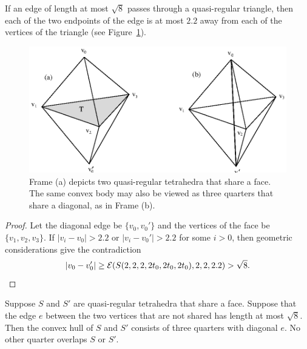 \begin{lemma} \label{lemma:qrtet-pair-pass}
If an edge of length at most $\sqrt{8}$ passes through a
quasi-regular triangle, then each of the two endpoints of the edge
is at most $2.2$ away from each of the vertices of the triangle
(see Figure~\ref{fig:dia31}).
\end{lemma}

\begin{figure}[htb]
  \centering
  \includegraphics{PS/dia31.ps}
  \caption{Frame (a) depicts two quasi-regular tetrahedra that share
  a face.  The same convex body may also be viewed as three quarters
  that share a diagonal, as in Frame (b).}
  \label{fig:dia31}
\end{figure}


\begin{proof}
Let the diagonal edge be $\{v_0,v_0'\}$ and the vertices of the
face be $\{v_1,v_2,v_3\}$.  If $|v_i-v_0|>2.2$ or $|v_i-v_0'|>2.2$
for some $i>0$, then geometric considerations give the
contradiction
$$|v_0-v_0'|\ge{{\mathcal E}}(S(2,2,2,2t_0,2t_0,2t_0),2,2,2.2) > \sqrt8.$$
\end{proof}

%

\begin{lemma}\label{lemma:qrtet-quarter}
Suppose $S$ and $S'$ are quasi-regular tetrahedra that share a
face.  Suppose that the edge $e$ between the two vertices that are
not shared has length at most $\sqrt8$.   Then the convex hull of
$S$ and $S'$ consists of three quarters with diagonal $e$.  No
other quarter overlaps $S$ or $S'$.
\end{lemma}

